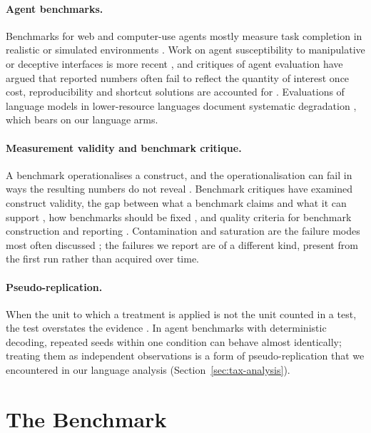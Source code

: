 \documentclass[sigconf,review,anonymous]{acmart}
\begin{document}
\paragraph{Agent benchmarks.}
Benchmarks for web and computer-use agents mostly measure task completion in
realistic or simulated environments
\cite{zhou2024webarena,deng2023mind2web,xie2024osworld}. Work on agent
susceptibility to manipulative or deceptive interfaces is more recent
\cite{TODO-prior-agent-darkpattern-benchmarks}, and critiques of agent
evaluation have argued that reported numbers often fail to reflect the
quantity of interest once cost, reproducibility and shortcut solutions are
accounted for \cite{kapoor2024agents}. Evaluations of language models in
lower-resource languages document systematic degradation
\cite{TODO-multilingual-llm-evaluation}, which bears on our language arms.

\paragraph{Measurement validity and benchmark critique.}
A benchmark operationalises a construct, and the operationalisation can fail
in ways the resulting numbers do not reveal \cite{jacobs2021measurement}.
Benchmark critiques have examined construct validity, the gap between what a
benchmark claims and what it can support \cite{raji2021benchmark}, how
benchmarks should be fixed \cite{bowman2021fix}, and quality criteria for
benchmark construction and reporting \cite{reuel2024betterbench}.
Contamination and saturation are the failure modes most often discussed
\cite{TODO-contamination-saturation}; the failures we report are of a
different kind, present from the first run rather than acquired over time.

\paragraph{Pseudo-replication.}
When the unit to which a treatment is applied is not the unit counted in a
test, the test overstates the evidence \cite{hurlbert1984pseudo}. In agent
benchmarks with deterministic decoding, repeated seeds within one condition
can behave almost identically; treating them as independent observations is a
form of pseudo-replication that we encountered in our language analysis
(Section~\ref{sec:tax-analysis}).

\section{The Benchmark}
\label{sec:benchmark}
\end{document}
